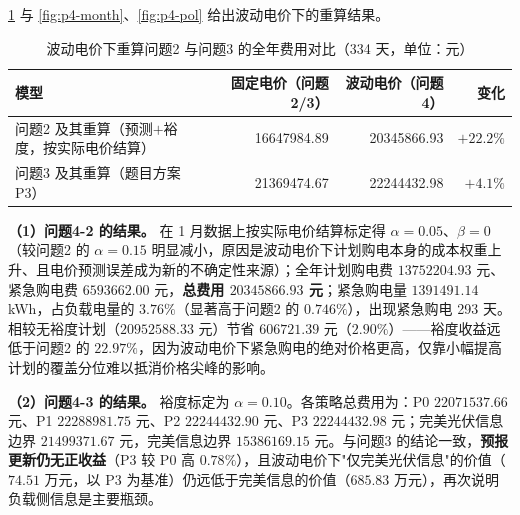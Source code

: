 \cref{tab:p4-summary} 与 \cref{fig:p4-month}、\cref{fig:p4-pol} 给出波动电价下的重算结果。

\begin{table}[H]
  \centering
  \caption{波动电价下重算问题2 与问题3 的全年费用对比（334 天，单位：元）}
  \label{tab:p4-summary}
  \small
  \footnotesize\begin{tabular}{lrrr}
    \toprule[1.5pt]
    模型 & 固定电价（问题2/3） & 波动电价（问题4） & 变化 \\
    \midrule[1pt]
    问题2 及其重算（预测$+$裕度，按实际电价结算） & 16647984.89 & 20345866.93 & $+22.2\%$ \\
    问题3 及其重算（题目方案 P3）                 & 21369474.67 & 22244432.98 & $+4.1\%$ \\
    \bottomrule[1.5pt]
  \end{tabular}
\end{table}

\textbf{（1）问题4-2 的结果。} 在 1 月数据上按实际电价结算标定得 $\alpha=0.05$、$\beta=0$（较问题2 的 $\alpha=0.15$ 明显减小，原因是波动电价下计划购电本身的成本权重上升、且电价预测误差成为新的不确定性来源）；全年计划购电费 $13752204.93$ 元、紧急购电费 $6593662.00$ 元，\textbf{总费用 $20345866.93$ 元}；紧急购电量 $1391491.14$ \si{kWh}，占负载电量的 $3.76\%$（显著高于问题2 的 $0.746\%$），出现紧急购电 293 天。相较无裕度计划（$20952588.33$ 元）节省 $606721.39$ 元（\textbf{$2.90\%$}）——裕度收益远低于问题2 的 $22.97\%$，因为波动电价下紧急购电的绝对价格更高，仅靠小幅提高计划的覆盖分位难以抵消价格尖峰的影响。

\textbf{（2）问题4-3 的结果。} 裕度标定为 $\alpha=0.10$。各策略总费用为：P0 $22071537.66$ 元、P1 $22288981.75$ 元、P2 $22244432.90$ 元、P3 $22244432.98$ 元；完美光伏信息边界 $21499371.67$ 元，完美信息边界 $15386169.15$ 元。与问题3 的结论一致，\textbf{预报更新仍无正收益}（P3 较 P0 高 $0.78\%$），且波动电价下"仅完美光伏信息"的价值（$74.51$ 万元，以 P3 为基准）仍远低于完美信息的价值（$685.83$ 万元），再次说明负载侧信息是主要瓶颈。

